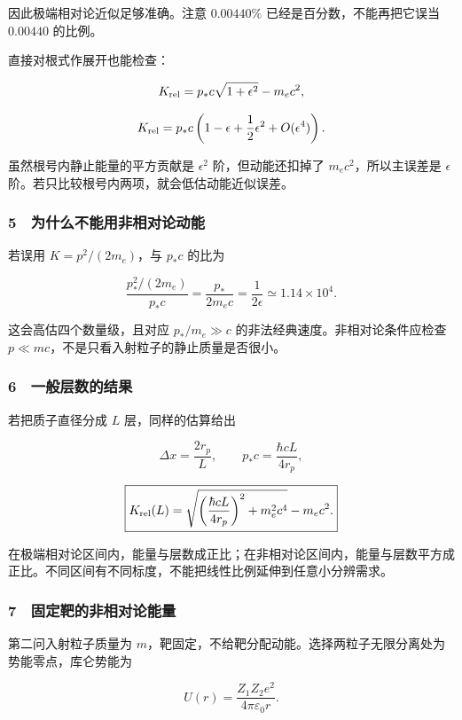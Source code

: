 \documentclass[12pt,a4paper,fontset=fandol]{ctexart}
\begin{document}
因此极端相对论近似足够准确。注意 \(0.00440\%\)
已经是百分数，不能再把它误当 \(0.00440\) 的比例。

直接对根式作展开也能检查：

\[K_{\rm rel}
=p_*c\sqrt{1+\epsilon^2}-m_ec^2,\]

\[K_{\rm rel}
=p_*c\left(1-\epsilon+\frac12\epsilon^2+O(\epsilon^4)\right).\]

虽然根号内静止能量的平方贡献是 \(\epsilon^2\) 阶，但动能还扣掉了
\(m_ec^2\)，所以主误差是 \(\epsilon\)
阶。若只比较根号内两项，就会低估动能近似误差。

\subsubsection{5　为什么不能用非相对论动能}\label{ux4e3aux4ec0ux4e48ux4e0dux80fdux7528ux975eux76f8ux5bf9ux8bbaux52a8ux80fd}

若误用 \(K=p^2/(2m_e)\)，与 \(p_*c\) 的比为

\[\frac{p_*^2/(2m_e)}{p_*c}
=\frac{p_*}{2m_ec}=\frac1{2\epsilon}
\simeq1.14\times10^4.\]

这会高估四个数量级，且对应 \(p_*/m_e\gg c\)
的非法经典速度。非相对论条件应检查
\(p\ll mc\)，不是只看入射粒子的静止质量是否很小。

\subsubsection{6　一般层数的结果}\label{ux4e00ux822cux5c42ux6570ux7684ux7ed3ux679c}

若把质子直径分成 \(L\) 层，同样的估算给出

\[\Delta x=\frac{2r_p}{L},
\qquad p_*c=\frac{\hbar cL}{4r_p},\]

\[\boxed{K_{\rm rel}(L)
=\sqrt{\left(\frac{\hbar cL}{4r_p}\right)^2+m_e^2c^4}
-m_ec^2.}\]

在极端相对论区间内，能量与层数成正比；在非相对论区间内，能量与层数平方成正比。不同区间有不同标度，不能把线性比例延伸到任意小分辨需求。

\subsubsection{7　固定靶的非相对论能量}\label{ux56faux5b9aux9776ux7684ux975eux76f8ux5bf9ux8bbaux80fdux91cf}

第二问入射粒子质量为
\(m\)，靶固定，不给靶分配动能。选择两粒子无限分离处为势能零点，库仑势能为

\[U(r)=\frac{Z_1Z_2e^2}{4\pi\varepsilon_0r}.\]
\end{document}
